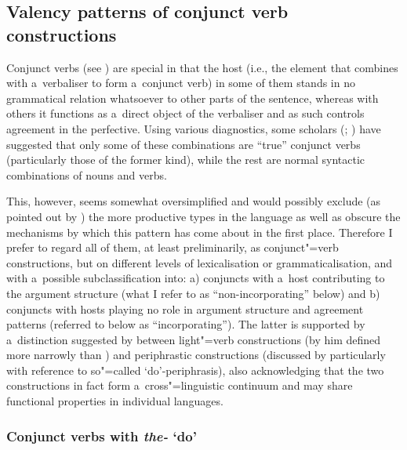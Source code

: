 \subsection{Valency patterns of conjunct verb constructions}
\label{subsec:12-2-8}

Conjunct verbs (see ) are special in that the host (i.e., the element that combines with a~verbaliser to form a~conjunct verb) in some of them stands in no grammatical relation whatsoever to other parts of the sentence, whereas with others it functions as a~direct object of the verbaliser and as such controls agreement in the perfective. Using various diagnostics, some scholars (\citealt[201]{verma1993}; \citealt[165]{mohanan1993}) have suggested that only some of these combinations are ``true'' conjunct verbs (particularly those of the former kind), while the rest are normal syntactic combinations of nouns and verbs. 



This, however, seems somewhat oversimplified and would possibly exclude (as pointed out by \citealt[160]{masica1993}) the more productive types in the language as well as obscure the mechanisms by which this pattern has come about in the first place. Therefore I prefer to regard all of them, at least preliminarily, as conjunct"=verb constructions, but on different levels of lexicalisation or grammaticalisation, and with a~possible subclassification into: a) conjuncts with a~host contributing to the argument structure (what I refer to as ``non-incorporating'' below) and b) conjuncts with hosts playing no role in argument structure and agreement patterns (referred to below as ``incorporating''). The latter is supported by a~distinction suggested by \citet[69--74]{jaeger2006} between light"=verb constructions (by him defined more narrowly than \citealt{butt2010}) and periphrastic constructions (discussed by \citeauthor{jaeger2006} particularly with reference to so"=called `do'-periphrasis), also acknowledging that the two constructions in fact form a~cross"=linguistic continuum and may share functional properties in individual languages. 



\subsubsection*{Conjunct verbs with \textit{the-} `do'}

